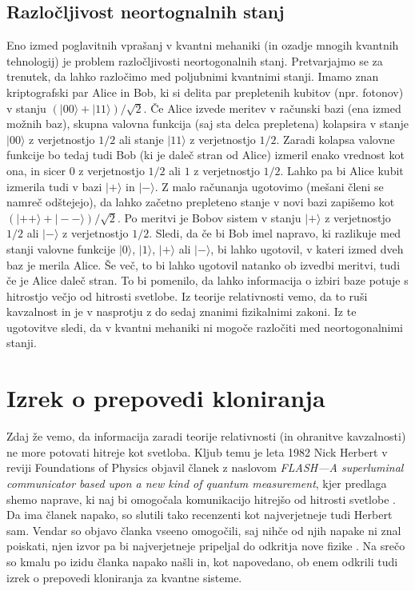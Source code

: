 \documentclass[12pt]{article}
\begin{document}
\subsection{Razločljivost neortognalnih stanj}

Eno izmed poglavitnih vprašanj v kvantni mehaniki (in ozadje mnogih kvantnih tehnologij) je problem razločljivosti neortogonalnih stanj. Pretvarjajmo se za trenutek, da lahko razločimo med poljubnimi kvantnimi stanji. Imamo znan kriptografski par Alice in Bob, ki si delita par prepletenih kubitov (npr. fotonov) v stanju $ ( | 00 \rangle + | 11 \rangle ) / \sqrt{2}$. Če Alice izvede meritev v računski bazi (ena izmed možnih baz), skupna valovna funkcija (saj sta delca prepletena) kolapsira v stanje $| 00 \rangle$ z verjetnostjo $1/2$ ali stanje $| 11 \rangle$ z verjetnostjo $1/2$. Zaradi kolapsa valovne funkcije bo tedaj tudi Bob (ki je daleč stran od Alice) izmeril enako vrednost kot ona, in sicer $ 0 $ z verjetnostjo $1/2$ ali $ 1 $ z verjetnostjo $1/2$. Lahko pa bi Alice kubit izmerila tudi v bazi $| + \rangle$ in $| - \rangle$. Z malo računanja ugotovimo (mešani členi se namreč odštejejo), da lahko začetno prepleteno stanje v novi bazi zapišemo kot $ ( | ++ \rangle + | -- \rangle ) / \sqrt{2} $. Po meritvi je Bobov sistem   v stanju $| + \rangle $ z verjetnostjo $1/2$ ali $| - \rangle $ z verjetnostjo $1/2$. Sledi, da če bi Bob imel napravo, ki razlikuje med stanji valovne funkcije  $| 0 \rangle$, $| 1 \rangle$, $|+ \rangle$ ali $| - \rangle$, bi lahko ugotovil, v kateri izmed dveh baz je merila Alice. Še več, to bi lahko ugotovil natanko ob izvedbi meritvi, tudi če je Alice daleč stran. To bi pomenilo, da lahko informacija o izbiri baze potuje s hitrostjo večjo od hitrosti svetlobe. Iz teorije relativnosti vemo, da to ruši kavzalnost in je v nasprotju z do sedaj znanimi fizikalnimi zakoni. Iz te ugotovitve sledi, da v kvantni mehaniki ni mogoče razločiti med neortogonalnimi stanji. \cite{nielsenQuantumComputationQuantum2012}  
 
 \section{Izrek o prepovedi kloniranja}
   Zdaj že vemo, da informacija zaradi teorije relativnosti (in ohranitve kavzalnosti) ne more potovati hitreje kot svetloba. Kljub temu je leta 1982 Nick Herbert v reviji Foundations of Physics objavil članek z naslovom \emph{FLASH—A superluminal communicator based upon a new kind of quantum measurement}, kjer predlaga shemo naprave, ki naj bi omogočala komunikacijo hitrejšo od hitrosti svetlobe \cite{herbertFLASHSuperluminalCommunicator1982}. Da ima članek napako, so slutili tako recenzenti kot najverjetneje tudi Herbert sam. Vendar so objavo članka vseeno omogočili, saj nihče od njih napake ni znal poiskati, njen izvor pa bi najverjetneje pripeljal do odkritja nove fizike \cite{peresHowNocloningTheorem2003}. Na srečo so kmalu po izidu članka napako našli \cite{woottersSingleQuantumCannot1982} in, kot napovedano, ob enem odkrili tudi izrek o prepovedi kloniranja za kvantne sisteme.
\end{document}

